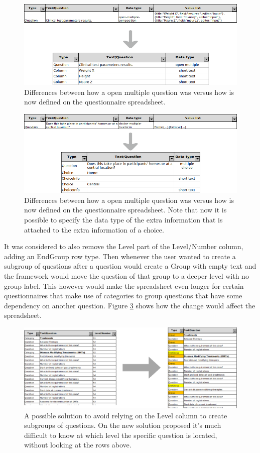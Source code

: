 \begin{figure}
    \center
    \includegraphics[width=.75\textwidth]{open-multiple-neu}
    \caption{Differences between how a open multiple question was versus how is now defined on the questionnaire spreadsheet.}
    \label{fig:open-multiple-neu}
\end{figure}

\begin{figure}
    \center
    \includegraphics[width=.75\textwidth]{choice-neu}
    \caption{Differences between how a open multiple question was versus how is now defined on the questionnaire spreadsheet.
    Note that now it is possible to specify the data type of the extra information that is attached to the extra information of a choice.}
    \label{fig:choice-neu}
\end{figure}

It was considered to also remove the Level part of the Level/Number column, adding an EndGroup row type.
Then whenever the user wanted to create a subgroup of questions after a question would create a Group with empty text and the framework would move the question of that group to a deeper level with no group label.
This however would make the spreadsheet even longer for certain questionnaires that make use of categories to group questions that have some dependency on another question.
Figure \ref{fig:excel-end-group} shows how the change would affect the spreadsheet.

\begin{figure}[h]
    \center
    \includegraphics[width=\textwidth]{excel-end-group}
    \caption{A possible solution to avoid relying on the Level column to create subgroups of questions. On the new solution proposed it's much difficult to know at which level the specific question is located, without looking at the rows above.}
    \label{fig:excel-end-group}
\end{figure}

